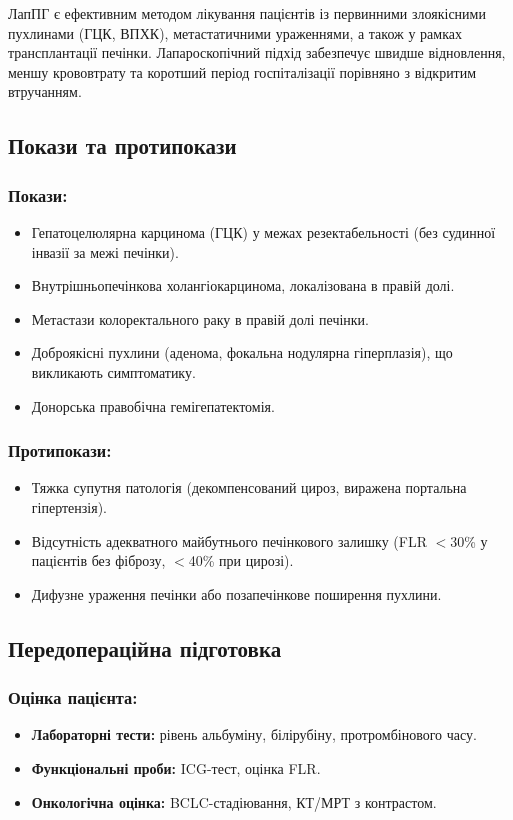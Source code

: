 \begin{refsection}
ЛапПГ є ефективним методом лікування пацієнтів із первинними злоякісними пухлинами (ГЦК, ВПХК), метастатичними ураженнями, а також у рамках трансплантації печінки. Лапароскопічний підхід забезпечує швидше відновлення, меншу крововтрату та коротший період госпіталізації порівняно з відкритим втручанням.

\subsection{Покази та протипокази}
\subsubsection{Покази:}
\begin{itemize}
    \item Гепатоцелюлярна карцинома (ГЦК) у межах резектабельності (без судинної інвазії за межі печінки).
    \item Внутрішньопечінкова холангіокарцинома, локалізована в правій долі.
    \item Метастази колоректального раку в правій долі печінки.
    \item Доброякісні пухлини (аденома, фокальна нодулярна гіперплазія), що викликають симптоматику.
    \item Донорська правобічна гемігепатектомія.
\end{itemize}

\subsubsection{Протипокази:}
\begin{itemize}
    \item Тяжка супутня патологія (декомпенсований цироз, виражена портальна гіпертензія).
    \item Відсутність адекватного майбутнього печінкового залишку (FLR $<$30\% у пацієнтів без фіброзу, $<$40\% при цирозі).
    \item Дифузне ураження печінки або позапечінкове поширення пухлини.
\end{itemize}

\subsection{Передопераційна підготовка}
\subsubsection{Оцінка пацієнта:}
\begin{itemize}
    \item \textbf{Лабораторні тести:} рівень альбуміну, білірубіну, протромбінового часу.
    \item \textbf{Функціональні проби:} ICG-тест, оцінка FLR.
    \item \textbf{Онкологічна оцінка:} BCLC-стадіювання, КТ/МРТ з контрастом.
\end{itemize}


\end{refsection}
